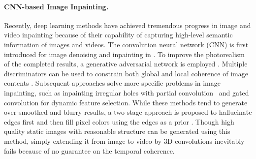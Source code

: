 \paragraph{CNN-based Image Inpainting.}
Recently, deep learning methods have achieved tremendous progress in image and video inpainting because of their capability of capturing high-level semantic information of images and videos. 
%
The convolution neural network (CNN) is first introduced for image denoising and inpainting in \cite{xie2012image}. 
To improve the photorealism of the completed results, a generative adversarial network is employed \cite{pathak2016context}.
Multiple discriminators can be used to constrain both global and local coherence of image contents \cite{iizuka2017globally}. 
Subsequent approaches solve more specific problems in image inpainting, such as inpainting irregular holes with partial convolution~\cite{liu2018partialinpainting} and gated convolution \cite{yu2018free} for dynamic feature selection.
%
While these methods tend to generate over-smoothed and blurry results, a two-stage approach is proposed to hallucinate edges first and then fill pixel colors using the edges as a prior \cite{nazeri2019edgeconnect}. 
Though high quality static images with reasonable structure can be generated using this method, simply extending it from image to video by 3D convolutions inevitably fails because of no guarantee on the temporal coherence.
 

